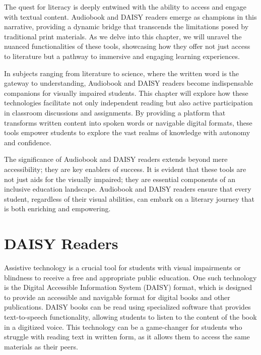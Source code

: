 \documentclass[12pt,letterpaper,twoside]{extreport}
\begin{document}
The quest for literacy is deeply entwined with the ability to access and engage with textual content. Audiobook and DAISY readers emerge as champions in this narrative, providing a dynamic bridge that transcends the limitations posed by traditional print materials. As we delve into this chapter, we will unravel the nuanced functionalities of these tools, showcasing how they offer not just access to literature but a pathway to immersive and engaging learning experiences.

In subjects ranging from literature to science, where the written word is the gateway to understanding, Audiobook and DAISY readers become indispensable companions for visually impaired students. This chapter will explore how these technologies facilitate not only independent reading but also active participation in classroom discussions and assignments. By providing a platform that transforms written content into spoken words or navigable digital formats, these tools empower students to explore the vast realms of knowledge with autonomy and confidence.

The significance of Audiobook and DAISY readers extends beyond mere accessibility; they are key enablers of success. It is evident that these tools are not just aids for the visually impaired; they are essential components of an inclusive education landscape. Audiobook and DAISY readers ensure that every student, regardless of their visual abilities, can embark on a literary journey that is both enriching and empowering.

\hypertarget{text-to-speech-music-podcast}{}\section{DAISY Readers}\label{text-to-speech-music-podcast}

Assistive technology is a crucial tool for students with visual impairments or blindness to receive a free and appropriate public education. One such technology is the Digital Accessible Information System (DAISY) format, which is designed to provide an accessible and navigable format for digital books and other publications. DAISY books can be read using specialized software that provides text-to-speech functionality, allowing students to listen to the content of the book in a digitized voice. This technology can be a game-changer for students who struggle with reading text in written form, as it allows them to access the same materials as their peers.
\end{document}
